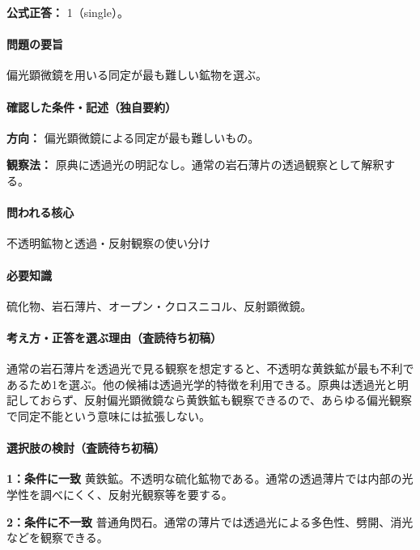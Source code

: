 \textbf{公式正答：} 1（single）。

\paragraph{問題の要旨} 偏光顕微鏡を用いる同定が最も難しい鉱物を選ぶ。

\paragraph{確認した条件・記述（独自要約）}\mbox{}\par

\noindent\textbf{方向：} 偏光顕微鏡による同定が最も難しいもの。\par

\noindent\textbf{観察法：} 原典に透過光の明記なし。通常の岩石薄片の透過観察として解釈する。\par

\paragraph{問われる核心} 不透明鉱物と透過・反射観察の使い分け

\paragraph{必要知識} 硫化物、岩石薄片、オープン・クロスニコル、反射顕微鏡。

\paragraph{考え方・正答を選ぶ理由（査読待ち初稿）} 通常の岩石薄片を透過光で見る観察を想定すると、不透明な黄鉄鉱が最も不利であるため1を選ぶ。他の候補は透過光学的特徴を利用できる。原典は透過光と明記しておらず、反射偏光顕微鏡なら黄鉄鉱も観察できるので、あらゆる偏光観察で同定不能という意味には拡張しない。

\paragraph{選択肢の検討（査読待ち初稿）}\mbox{}\par

\noindent\textbf{1：条件に一致} 黄鉄鉱。不透明な硫化鉱物である。通常の透過薄片では内部の光学性を調べにくく、反射光観察等を要する。\par

\noindent\textbf{2：条件に不一致} 普通角閃石。通常の薄片では透過光による多色性、劈開、消光などを観察できる。\par

